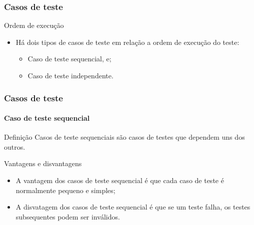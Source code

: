 \begin{frame}
\frametitle{Casos de teste}

\begin{block:fact}{Ordem de execução}
\begin{itemize}
    \item Há dois tipos de casos de teste em relação a ordem de execução do teste:
	\begin{itemize}
		\item Caso de teste sequencial, e;
		\item Caso de teste independente.
	\end{itemize}
\end{itemize}
\end{block:fact}
\end{frame}


\begin{frame}
\label{concept:cascading-test-case}
\frametitle{Casos de teste}
\framesubtitle{Caso de teste sequencial}

\begin{block:concept}{Definição}
Casos de teste sequenciais são casos de testes que dependem uns dos outros.
\end{block:concept}


\begin{block:fact}{Vantagens e disvantagens}
\begin{itemize}
	\item A vantagem dos casos de teste sequencial é que cada caso de teste é normalmente pequeno e simples;

	\item A disvatagem dos casos de teste sequencial é que se um teste falha, os testes subsequentes podem ser inválidos.
\end{itemize}
\end{block:fact}

\hfill
{}
\end{frame}



